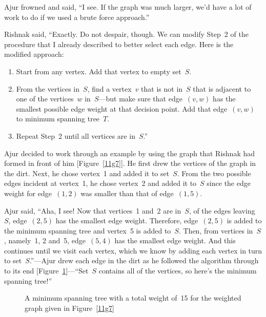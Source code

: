 Ajur frowned and said, ``I see. If the graph was much larger, we'd have a lot of work to do if we used a brute force approach.''

Rishnak said, ``Exactly. Do not despair, though. We can modify Step~2 of the procedure that I already described to better select each edge. Here is the modified approach:
\begin{enumerate}
\item Start from any vertex. Add that vertex to empty set~$S$.
\item From the vertices in~$S$, find a vertex~$v$ that is not in~$S$ that is adjacent to one of the vertices~$w$ in~$S$---but make sure that edge~$(v,w)$ has the smallest possible edge weight at that decision point. Add that edge~$(v,w)$ to minimum spanning tree~$T$.
\item Repeat Step~2 until all vertices are in~$S$.''
\end{enumerate}

Ajur decided to work through an example by using the graph that Rishnak had formed in front of him [Figure~\ref{11g7}]. He first drew the vertices of the graph in the dirt. Next, he chose vertex~1 and added it to set~$S$. From the two possible edges incident at vertex~1, he chose vertex~2 and added it to~$S$ since the edge weight for edge~$(1,2)$ was smaller than that of edge~$(1,5)$.

Ajur said, ``Aha, I see! Now that vertices~1 and~2 are in~$S$, of the edges leaving~$S$, edge~$(2,5)$ has the smallest edge weight. Therefore, edge~$(2,5)$ is added to the minimum spanning tree and vertex~5 is added to~$S$. Then, from vertices in~$S$, namely~1, 2 and~5, edge~$(5,4)$ has the smallest edge weight. And this continues until we visit each vertex, which we know by adding each vertex in turn to set~$S$.''---Ajur drew each edge in the dirt as he followed the algorithm through to its end [Figure~\ref{11g8}]---``Set~$S$ contains all of the vertices, so here's the minimum spanning tree!''

\begin{figure}
\begin{center}
\caption{A minimum spanning tree with a total weight of~15 for the weighted graph given in Figure~\ref{11g7}}\label{11g8}
\end{center}
\end{figure}

